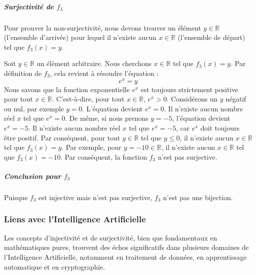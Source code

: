 \documentclass[12pt,a4paper]{report}
\begin{document}
\subparagraph{\texorpdfstring{Surjectivité de
\(f_3\)}{Surjectivité de f\_3}}\label{surjectivituxe9-de-f_3}

Pour prouver la non-surjectivité, nous devons trouver un élément
\(y \in \mathbb{R}\) (l'ensemble d'arrivée) pour lequel il n'existe
aucun \(x \in \mathbb{R}\) (l'ensemble de départ) tel que
\(f_3(x) = y\).

Soit \(y \in \mathbb{R}\) un élément arbitraire. Nous cherchons
\(x \in \mathbb{R}\) tel que \(f_3(x) = y\). Par définition de \(f_3\),
cela revient à résoudre l'équation : \[e^x = y\] Nous savons que la
fonction exponentielle \(e^x\) est toujours strictement positive pour
tout \(x \in \mathbb{R}\). C'est-à-dire, pour tout \(x \in \mathbb{R}\),
\(e^x > 0\). Considérons un \(y\) négatif ou nul, par exemple \(y = 0\).
L'équation devient \(e^x = 0\). Il n'existe aucun nombre réel \(x\) tel
que \(e^x = 0\). De même, si nous prenons \(y = -5\), l'équation devient
\(e^x = -5\). Il n'existe aucun nombre réel \(x\) tel que \(e^x = -5\),
car \(e^x\) doit toujours être positif. Par conséquent, pour tout
\(y \in \mathbb{R}\) tel que \(y \le 0\), il n'existe aucun
\(x \in \mathbb{R}\) tel que \(f_3(x) = y\). Par exemple, pour
\(y = -10 \in \mathbb{R}\), il n'existe aucun \(x \in \mathbb{R}\) tel
que \(f_3(x) = -10\). Par conséquent, la fonction \(f_3\) n'est pas
surjective.

\subparagraph{\texorpdfstring{Conclusion pour
\(f_3\)}{Conclusion pour f\_3}}\label{conclusion-pour-f_3}

Puisque \(f_3\) est injective mais n'est pas surjective, \(f_3\) n'est
pas une bijection.

\subsubsection{Liens avec l'Intelligence
Artificielle}\label{liens-avec-lintelligence-artificielle}

Les concepts d'injectivité et de surjectivité, bien que fondamentaux en
mathématiques pures, trouvent des échos significatifs dans plusieurs
domaines de l'Intelligence Artificielle, notamment en traitement de
données, en apprentissage automatique et en cryptographie.
\end{document}
